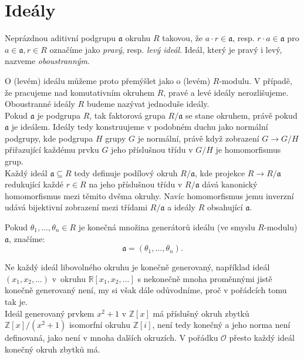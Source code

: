 \documentclass [12pt]{report}
\begin{document}
\section{Ideály}

\begin{definice}
Neprázdnou aditivní podgrupu $\mathfrak{a}$ okruhu $R$ takovou, že $a \cdot r \in \mathfrak{a}$, resp. $r \cdot a \in \mathfrak{a}$ pro $a \in \mathfrak{a}, r \in R$ označíme jako \textit{pravý}, resp. \textit{levý ideál}. Ideál, který je pravý i levý, nazveme \textit{oboustranným}.
\end{definice}
O (levém) ideálu můžeme proto přemýšlet jako o (levém) $R$-modulu. V případě, že pracujeme nad komutativním okruhem $R$, pravé a levé ideály nerozlišujeme. Oboustranné ideály $R$ budeme nazývat jednoduše ideály.\\


Pokud $\mathfrak{a}$ je podgrupa $R$, tak faktorová grupa $R/\mathfrak{a}$ se stane okruhem, právě pokud $\mathfrak{a}$ je ideálem. Ideály tedy konstruujeme v podobném duchu jako normální podgrupy, kde podgrupa $H$ grupy $G$ je normální, právě když zobrazení $G \longrightarrow G/H$ přiřazující každému prvku $G$ jeho příslušnou třídu v $G/H$ je homomorfismus grup.\\

Každý ideál $\mathfrak{a} \subseteq R$ tedy definuje podílový okruh $R/\mathfrak{a}$, kde projekce $R \longrightarrow R/\mathfrak{a}$ redukující každé $r \in R$ na jeho příslušnou třídu v $R/\mathfrak{a}$ dává kanonický homomorfismus mezi těmito dvěma okruhy. Navíc homomorfismus jemu inverzní udává bijektivní zobrazení mezi třídami $R/\mathfrak{a}$ a ideály $R$ obsahující $\mathfrak{a}$.\\


\begin{definice}
Pokud $\theta_1,\dots,\theta_n \in R$ je konečná množina generátorů ideálu (ve smyslu $R$-modulu) $\mathfrak{a}$, značíme:
\begin{equation*}
\mathfrak{a} = (\theta_1,\dots,\theta_n).
\end{equation*}
\end{definice}

Ne každý ideál libovolného okruhu je konečně generovaný, například ideál $(x_1,x_2,\dots)$ v~okruhu $\mathbb{R}[x_1,x_2,\dots]$ s nekonečně mnoha proměnnými jistě konečně generovaný není, my si však dále odůvodníme, proč v pořádcích tomu tak je.\\

Ideál generovaný prvkem $x^2+1$ v $\mathbb{Z}[x]$ má příslušný okruh zbytků $\mathbb{Z}[x]/(x^2+1)$ isomorfní okruhu $\mathbb{Z}[i]$, není tedy konečný a jeho norma není definovaná, jako není v mnoha dalších  okruzích. V pořádku $\mathcal{O}$ přesto každý ideál konečný okruh zbytků má.
\end{document}
